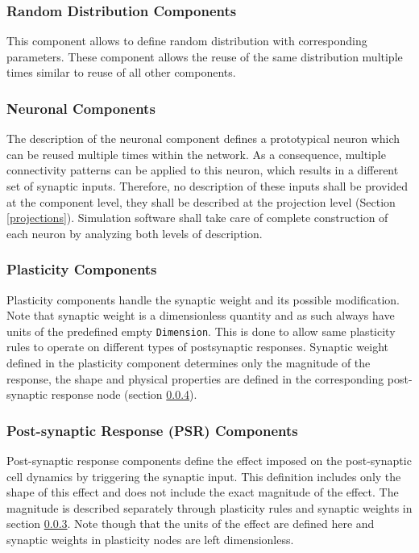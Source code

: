 \documentclass{article}
\begin{document}
\subsubsection{Random Distribution Components}
\label{randDist}

This component allows to define random distribution with corresponding
parameters. These component allows the reuse of the same distribution
multiple times similar to reuse of all other components.

\subsubsection{Neuronal Components}
\label{neuron}

The description of the neuronal component defines a prototypical neuron
which can be reused multiple times within the network. As a consequence,
multiple connectivity patterns can be applied to this neuron, which
results in a different set of synaptic inputs. Therefore, no description
of these inputs shall be provided at the component level, they shall be
described at the projection level (Section \ref{projections}). Simulation
software shall take care of complete construction of each neuron by
analyzing both levels of description.

\subsubsection{Plasticity Components}
\label{plasticity}

Plasticity components handle the synaptic weight and its possible
modification. Note that synaptic weight is a dimensionless quantity and
as such always have units of the predefined empty {\tt Dimension}. This
is done to allow same plasticity rules to operate on
different types of postsynaptic responses. Synaptic weight defined in the
plasticity component determines only the magnitude of the response, the
shape and physical properties are defined in the corresponding post-synaptic
response node (section \ref{secSynapse}).

\subsubsection{Post-synaptic Response (PSR) Components}
\label{secSynapse}

Post-synaptic response components define the effect imposed on the
post-synaptic cell dynamics by triggering the synaptic input. This
definition includes only the shape of this effect and does not include the
exact magnitude of the effect. The magnitude is described separately through
plasticity rules and synaptic weights in section \ref{plasticity}. Note
though that the units of the effect are defined here and synaptic weights in
plasticity nodes are left dimensionless.
\end{document}
